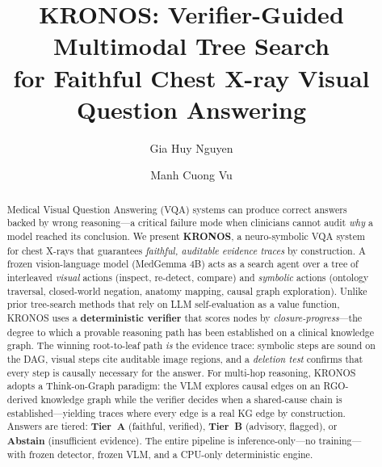 \documentclass[runningheads]{llncs}
\begin{document}
\title{KRONOS: Verifier-Guided Multimodal Tree Search\\for Faithful Chest X-ray Visual Question Answering}

\author{Gia Huy Nguyen \and Manh Cuong Vu}



\maketitle

\begin{abstract}
Medical Visual Question Answering (VQA) systems can produce correct answers
backed by wrong reasoning---a critical failure mode when clinicians cannot
audit \emph{why} a model reached its conclusion.
We present \textbf{KRONOS}, a neuro-symbolic VQA system for chest X-rays
that guarantees \emph{faithful, auditable evidence traces} by construction.
A frozen vision-language model (MedGemma 4B) acts as a search agent over a
tree of interleaved \emph{visual} actions (inspect, re-detect, compare) and
\emph{symbolic} actions (ontology traversal, closed-world negation, anatomy
mapping, causal graph exploration).
Unlike prior tree-search methods that rely on LLM self-evaluation as a value
function, KRONOS uses a \textbf{deterministic verifier} that scores nodes by
\emph{closure-progress}---the degree to which a provable reasoning path has
been established on a clinical knowledge graph.
The winning root-to-leaf path \emph{is} the evidence trace: symbolic steps
are sound on the DAG, visual steps cite auditable image regions, and
a \emph{deletion test} confirms that every step is causally necessary for
the answer.
For multi-hop reasoning, KRONOS adopts a Think-on-Graph paradigm: the VLM
explores causal edges on an RGO-derived knowledge graph while the verifier
decides when a shared-cause chain is established---yielding traces where
every edge is a real KG edge by construction.
Answers are tiered: \textbf{Tier~A} (faithful, verified), \textbf{Tier~B}
(advisory, flagged), or \textbf{Abstain} (insufficient evidence).
The entire pipeline is inference-only---no training---with frozen detector,
frozen VLM, and a CPU-only deterministic engine.

\end{abstract}
\end{document}
